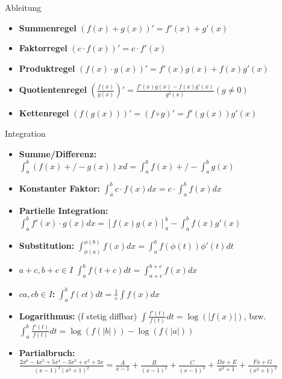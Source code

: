 \begin{Rechenregeln}{Ableitung}{}
    \begin{itemize}
        \item \textbf{Summenregel} $(f(x)+g(x))' = f'(x) + g'(x)$
        \item \textbf{Faktorregel} $(c\cdot f(x))' = c\cdot f'(x)$
        \item \textbf{Produktregel} $(f(x)\cdot g(x))' = f'(x)g(x) + f(x)g'(x)$
        \item \textbf{Quotientenregel} $\left(\frac{f(x)}{g(x)}\right)' = \frac{f'(x)g(x) - f(x)g'(x)}{g^2(x)}(g\neq 0)$
        \item \textbf{Kettenregel} $(f(g(x)))' = (f\circ g)' = f'(g(x))g'(x)$
    \end{itemize}
\end{Rechenregeln}

\begin{Rechenregeln}{Integration}{}
    \begin{itemize}
    \item \textbf{Summe/Differenz:} $\int_a^b (f(x) +/- g(x)) xd = \int_a^b f(x) +/- \int_a^b g(x)$
    \item \textbf{Konstanter Faktor:} $\int_a^b c\cdot f(x)dx = c\cdot \int_a^b f(x)dx$
    \item \textbf{Partielle Integration:} $\int_a^b f'(x)\cdot g(x)dx = \left[f(x)g(x)\right]_a^b - \int_a^b f(x)g'(x)$
    \item \textbf{Substitution:} $\int_{\phi(a)}^{\phi(b)} f(x)dx = \int_a^b f(\phi(t))\phi '(t) dt$
    \item \textbf{$a+c, b+c \in I$} $\int_a^b f(t+c)dt = \int_{a+c}^{b+c} f(x)dx$
    \item \textbf{$ca,cb\in I$: } $\int_a^b f(ct)dt = \frac{1}{c}\int f(x)dx$
    \item \textbf{Logarithmus: }\;(f stetig diffbar) $\int\frac{f'(t)}{f(t)}dt = \log(|f(x)|)$, bzw. $\int_a^b\frac{f'(t)}{f(t)}dt = \log(f(|b|)) - \log(f(|a|))$
    \item \textbf{Partialbruch: }\\
     $\frac{2x^6-4x^5+5x^4-3x^3+x^2+3x}{(x-1)^3(x^2+1)^2} = \frac{A}{x-1}+\frac{B}{(x-1)^2}+\frac{C}{(x-1)^3}+\frac{Dx+E}{x^2+1}+\frac{Fx+G}{(x^2+1)^2}$
    \end{itemize}
\end{Rechenregeln}

